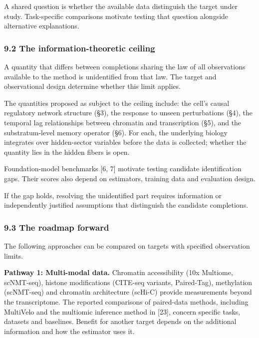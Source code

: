 \documentclass[
]{article}
\begin{document}
A shared question is whether the available data distinguish the target
under study. Task-specific comparisons motivate testing that question
alongside alternative explanations.

\hypertarget{the-information-theoretic-ceiling}{%
\subsubsection{9.2 The information-theoretic
ceiling}\label{the-information-theoretic-ceiling}}

A quantity that differs between completions sharing the law of all
observations available to the method is unidentified from that law. The
target and observational design determine whether this limit applies.

The quantities proposed as subject to the ceiling include: the cell's
causal regulatory network structure (§3), the response to unseen
perturbations (§4), the temporal lag relationships between chromatin and
transcription (§5), and the substratum-level memory operator (§6). For
each, the underlying biology integrates over hidden-sector variables
before the data is collected; whether the quantity lies in the hidden
fibers is open.

Foundation-model benchmarks {[}6, 7{]} motivate testing candidate
identification gaps. Their scores also depend on estimators, training
data and evaluation design.

If the gap holds, resolving the unidentified part requires information
or independently justified assumptions that distinguish the candidate
completions.

\hypertarget{the-roadmap-forward}{%
\subsubsection{9.3 The roadmap forward}\label{the-roadmap-forward}}

The following approaches can be compared on targets with specified
observation limits.

\textbf{Pathway 1: Multi-modal data.} Chromatin accessibility (10x
Multiome, scNMT-seq), histone modifications (CITE-seq variants,
Paired-Tag), methylation (scNMT-seq) and chromatin architecture (scHi-C)
provide measurements beyond the transcriptome. The reported comparisons
of paired-data methods, including MultiVelo and the multiomic inference
method in {[}23{]}, concern specific tasks, datasets and baselines.
Benefit for another target depends on the additional information and how
the estimator uses it.
\end{document}
